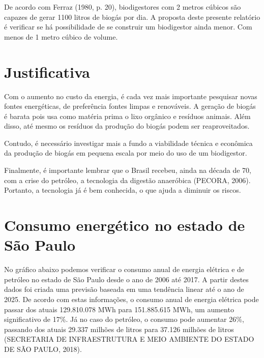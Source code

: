 De acordo com Ferraz (1980, p. 20), biodigestores com 2 metros cúbicos são capazes de gerar 1100 litros de biogás por dia. A proposta deste presente relatório é verificar se há possibilidade de se construir um biodigestor ainda menor. Com menos de 1 metro cúbico de volume.

\section{Justificativa}

Com o aumento no custo da energia, é cada vez mais importante pesquisar novas fontes energéticas, de preferência fontes limpas e renováveis. A geração de biogás é barata pois usa como matéria prima o lixo orgânico e resíduos animais. Além disso, até mesmo os resíduos da produção do biogás podem ser reaproveitados.

Contudo, é necessário investigar mais a fundo a viabilidade técnica e econômica da produção de biogás em pequena escala por meio do uso de um biodigestor. 

Finalmente, é importante lembrar que o Brasil recebeu, ainda na década de 70, com a crise do petróleo, a tecnologia da digestão anaeróbica (PECORA, 2006). Portanto, a tecnologia já é bem conhecida, o que ajuda a diminuir os riscos.

\section{Consumo energético no estado de São Paulo}

No gráfico abaixo podemos verificar o consumo anual de energia elétrica e de petróleo no estado de São Paulo desde o ano de 2006 até 2017. A partir destes dados foi criada uma previsão baseada em uma tendência linear até o ano de 2025. De acordo com estas informações, o consumo anual de energia elétrica pode passar dos atuais 129.810.078 MWh para 151.885.615 MWh, um aumento significativo de 17\%. Já no caso do petróleo, o consumo pode aumentar 26\%, passando dos atuais 29.337 milhões de litros para 37.126 milhões de litros (SECRETARIA DE INFRAESTRUTURA E MEIO AMBIENTE DO ESTADO DE SÃO PAULO, 2018).

\vspace{0.8cm}

